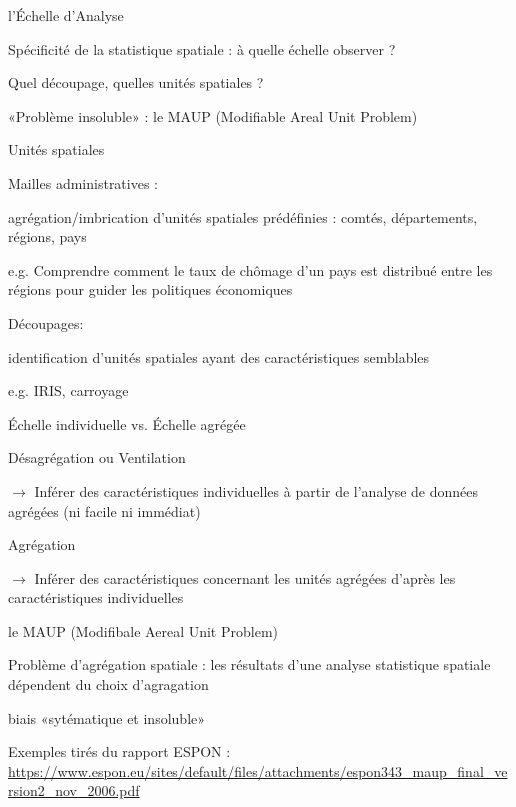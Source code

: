 \documentclass{beamer}
\begin{document}
\begin{frame}{l'Échelle d’Analyse}


Spécificité de la statistique spatiale : à quelle échelle observer ? 

Quel découpage, quelles unités spatiales ?

«Problème insoluble» : le \alert{MAUP} (Modifiable Areal Unit Problem)

\end{frame}

\begin{frame}{Unités spatiales }

\alert{Mailles administratives} : 

agrégation/imbrication d’unités spatiales prédéfinies : comtés, départements, régions, pays

e.g. Comprendre comment  le taux de chômage d’un pays est distribué entre les régions pour guider les politiques économiques


\alert{Découpages}: 

identification d'unités spatiales ayant des caractéristiques semblables

e.g. IRIS, carroyage 

\end{frame}


\begin{frame}{ Échelle individuelle vs. Échelle agrégée }

\alert{Désagrégation} ou  \alert{Ventilation} 


  $\rightarrow$ Inférer des caractéristiques individuelles à partir de l’analyse de données agrégées (ni facile ni immédiat)


\alert{Agrégation} 


$\rightarrow$ Inférer des caractéristiques concernant les unités agrégées d’après les caractéristiques individuelles 

\end{frame}

\begin{frame}{ le MAUP (Modifibale Aereal Unit Problem)}

Problème d'agrégation spatiale : les résultats d'une analyse statistique spatiale dépendent du choix d'agragation 

biais «sytématique et insoluble» 

Exemples tirés du rapport ESPON : \url{https://www.espon.eu/sites/default/files/attachments/espon343_maup_final_version2_nov_2006.pdf}

\end{frame}
\end{document}
